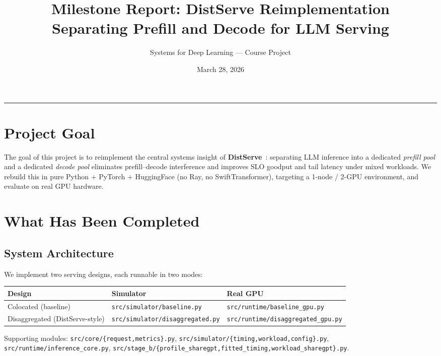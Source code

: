 \documentclass[11pt,letterpaper]{article}
\title{\textbf{Milestone Report: DistServe Reimplementation}\\
\large Separating Prefill and Decode for LLM Serving}
\author{Systems for Deep Learning --- Course Project}
\date{March 28, 2026}
\begin{document}
\maketitle
\vspace{-8pt}
\noindent\rule{\linewidth}{0.4pt}

\section{Project Goal}

The goal of this project is to reimplement the central systems insight of
\textbf{DistServe}~\cite{zhong2024distserve}: separating LLM inference into a
dedicated \emph{prefill pool} and a dedicated \emph{decode pool} eliminates
prefill--decode interference and improves SLO goodput and tail latency under mixed
workloads. We rebuild this in pure Python + PyTorch + HuggingFace (no Ray, no
SwiftTransformer), targeting a 1-node / 2-GPU environment, and evaluate on real GPU
hardware.

\section{What Has Been Completed}

\subsection{System Architecture}

We implement two serving designs, each runnable in two modes:

\begin{center}
\begin{tabular}{lll}
\toprule
\textbf{Design} & \textbf{Simulator} & \textbf{Real GPU} \\
\midrule
Colocated (baseline)             & \texttt{src/simulator/baseline.py}      & \texttt{src/runtime/baseline\_gpu.py} \\
Disaggregated (DistServe-style)  & \texttt{src/simulator/disaggregated.py} & \texttt{src/runtime/disaggregated\_gpu.py} \\
\bottomrule
\end{tabular}
\end{center}

Supporting modules: \texttt{src/core/\{request,metrics\}.py},
\texttt{src/simulator/\{timing,workload,config\}.py},
\texttt{src/runtime/inference\_core.py},
\texttt{src/stage\_b/\{profile\_sharegpt,fitted\_timing,workload\_sharegpt\}.py}.
\end{document}
